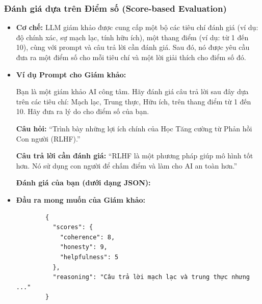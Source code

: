 \subsubsection{Đánh giá dựa trên Điểm số (Score-based Evaluation)}
\begin{itemize}
    \item \textbf{Cơ chế:} LLM giám khảo được cung cấp một bộ các tiêu chí đánh giá (ví dụ: độ chính xác, sự mạch lạc, tính hữu ích), một thang điểm (ví dụ: từ 1 đến 10), cùng với prompt và câu trả lời cần đánh giá. Sau đó, nó được yêu cầu đưa ra một điểm số cho mỗi tiêu chí và một lời giải thích cho điểm số đó.
    \item \textbf{Ví dụ Prompt cho Giám khảo:}
        \begin{tcolorbox}[colback=gray!5!white, colframe=gray!50!black, sharp corners]
        Bạn là một giám khảo AI công tâm. Hãy đánh giá câu trả lời sau đây dựa trên các tiêu chí: Mạch lạc, Trung thực, Hữu ích, trên thang điểm từ 1 đến 10. Hãy đưa ra lý do cho điểm số của bạn.

        \textbf{Câu hỏi:} “Trình bày những lợi ích chính của Học Tăng cường từ Phản hồi Con người (RLHF).”

        \textbf{Câu trả lời cần đánh giá:} “RLHF là một phương pháp giúp mô hình tốt hơn. Nó sử dụng con người để chấm điểm và làm cho AI an toàn hơn.”

        \textbf{Đánh giá của bạn (dưới dạng JSON):}
        \end{tcolorbox}
    \item \textbf{Đầu ra mong muốn của Giám khảo:}
        \begin{verbatim}
        {
          "scores": {
            "coherence": 8,
            "honesty": 9,
            "helpfulness": 5
          },
          "reasoning": "Câu trả lời mạch lạc và trung thực nhưng ..."
        }
        \end{verbatim}
\end{itemize}

